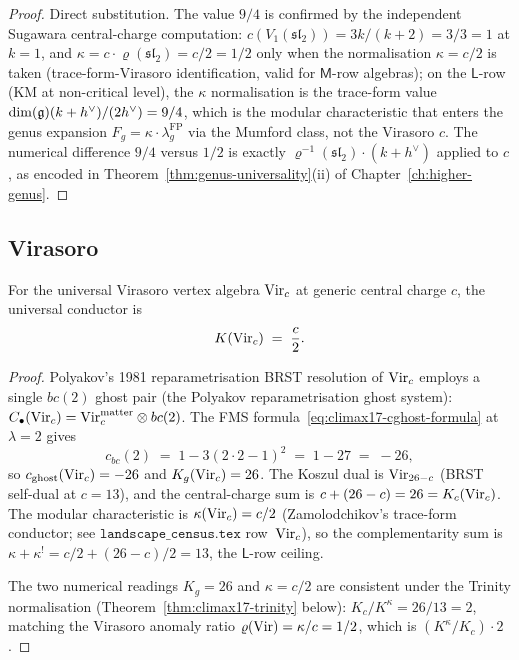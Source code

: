 \begin{proof}
Direct substitution. The value $9/4$ is confirmed by the independent
Sugawara central-charge computation: $c(V_1(\mathfrak{sl}_2))=3k/(k+2)
=3/3=1$ at $k=1$, and $\kappa=c\cdot\varrho(\mathfrak{sl}_2)=c/2
=1/2$ only when the normalisation $\kappa=c/2$ is taken
(trace-form-Virasoro identification, valid for $\mathsf{M}$-row
algebras); on the $\mathsf{L}$-row (KM at non-critical level), the
$\kappa$ normalisation is the trace-form value
$\dim(\mathfrak{g})(k+h^\vee)/(2h^\vee)=9/4$, which is the modular
characteristic that enters the genus expansion
$F_g=\kappa\cdot\lambda_g^{\mathrm{FP}}$ via the Mumford class, not
the Virasoro $c$. The numerical difference $9/4$ versus $1/2$ is
exactly $\varrho^{-1}(\mathfrak{sl}_2)\cdot(k+h^\vee)$ applied to
$c$, as encoded in Theorem~\ref{thm:genus-universality}\textup{(ii)}
of Chapter~\ref{ch:higher-genus}.
\end{proof}

\subsection{Virasoro}
\label{subsec:climax17-vir}

\begin{proposition}[$K(\Vir_c)=c/2$]
\label{prop:climax17-K-vir}
\ClaimStatusProvedHere
For the universal Virasoro vertex algebra $\mathrm{Vir}_c$ at generic central
charge $c$, the universal conductor is
\[
  K(\mathrm{Vir}_c)\;=\;\frac{c}{2}.
\]
\end{proposition}

\begin{proof}
Polyakov's 1981 reparametrisation BRST resolution of $\mathrm{Vir}_c$ employs a
single $bc(2)$ ghost pair (the Polyakov reparametrisation ghost
system): $C_\bullet(\mathrm{Vir}_c)=\mathrm{Vir}_c^{\mathrm{matter}}\otimes bc(2)$. The
FMS formula~\eqref{eq:climax17-cghost-formula} at $\lambda=2$ gives
\[
  c_{bc}(2)\;=\;1-3(2\cdot 2-1)^2\;=\;1-27\;=\;-26,
\]
so $c_{\mathrm{ghost}}(\mathrm{Vir}_c)=-26$ and $K_g(\mathrm{Vir}_c)=26$. The Koszul dual is
$\mathrm{Vir}_{26-c}$ (BRST self-dual at $c=13$), and the central-charge sum
is $c+(26-c)=26=K_c(\mathrm{Vir}_c)$. The modular characteristic is
$\kappa(\mathrm{Vir}_c)=c/2$ (Zamolodchikov's trace-form conductor; see
$\texttt{landscape\_census.tex}$ row~$\mathrm{Vir}_c$), so the complementarity
sum is $\kappa+\kappa^!=c/2+(26-c)/2=13$, the $\mathsf{L}$-row ceiling.

The two numerical readings $K_g=26$ and $\kappa=c/2$ are consistent
under the Trinity normalisation (Theorem~\ref{thm:climax17-trinity}
below): $K_c/K^\kappa=26/13=2$, matching the Virasoro anomaly ratio
$\varrho(\mathrm{Vir})=\kappa/c=1/2$, which is $(K^\kappa/K_c)\cdot 2$.
\end{proof}

